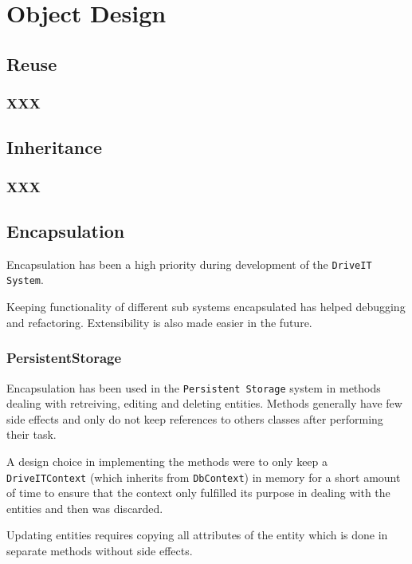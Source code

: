 \section{Object Design}

\subsection{Reuse}
\subsubsection{XXX}

\subsection{Inheritance}
\subsubsection{XXX}

\subsection{Encapsulation}
Encapsulation has been a high priority during development of the \texttt{DriveIT System}. 

Keeping functionality of different sub systems encapsulated has helped debugging and refactoring. Extensibility is also made easier in the future.

\subsubsection{PersistentStorage}
Encapsulation has been used in the \texttt{Persistent Storage} system in methods dealing with retreiving, editing and deleting entities. Methods generally have few side effects and only do not keep references to others classes after performing their task.

A design choice in implementing the methods were to only keep a \texttt{DriveITContext} (which inherits from \texttt{DbContext}) in memory for a short amount of time to ensure that the context only fulfilled its purpose in dealing with the entities and then was discarded.

Updating entities requires copying all attributes of the entity which is done in separate methods without side effects.